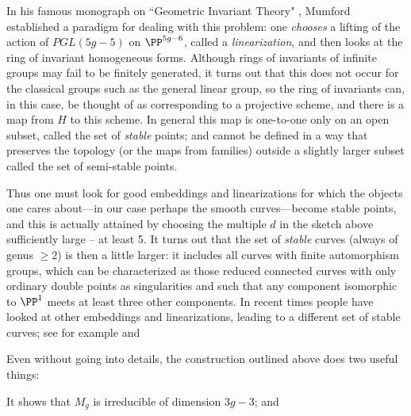 In his famous monograph on ``Geometric Invariant Theory" \cite{GIT}, Mumford established a paradigm for dealing with this problem: one \emph{chooses} a lifting of the action of $PGL(5g-5)$ on $\PP^{5g-6}$, called a \emph{linearization}, and then looks at the ring of invariant homogeneous forms. Although rings of invariants of infinite groups may fail to be finitely generated, it turns out that this does not occur for the classical groups such as the general linear group, so the ring of invariants can, in this case, be
thought of as corresponding to a projective scheme, and there is a map from $H$
to this scheme. In general this map is one-to-one only on an open subset, called the set of 
\emph{stable} points; and cannot be defined in a way that preserves the topology (or the maps from families) outside a slightly larger subset called the set of 
semi-stable points. 

Thus one must look for good embeddings and linearizations for which the objects one cares about---in our case perhaps the smooth curves---become stable points, and this is actually attained by choosing the multiple $d$ in the sketch above sufficiently large -- at least 5. It turns out that the 
set of \emph{stable} curves (always of genus $\geq 2$) is then a little larger: it includes all curves with finite automorphism groups, which can be characterized as those reduced connected curves with only ordinary double points as singularities and such that any component isomorphic to $\PP^1$ meets at least three other components. In recent times people have looked at other embeddings and linearizations, leading to a different set of stable curves; see for example \cite{Schubert} and \cite{Hassett} 


Even without going into details, the construction outlined above does two useful things:

It shows that $M_g$ is irreducible of dimension $3g-3$; and

